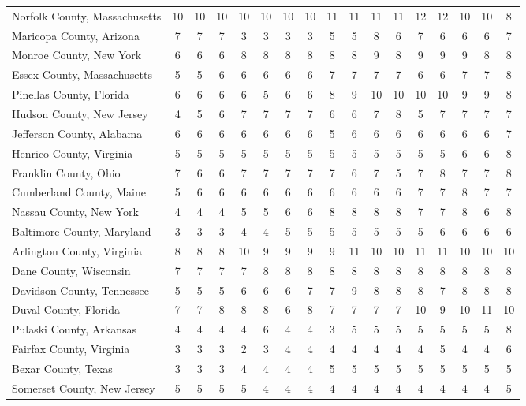 \begin{landscape}
\begin{longtable}{lcccccccccccccccc}
		Norfolk County, Massachusetts & 10 & 10 & 10 & 10 & 10 & 10 & 10 & 11 & 11 & 11 & 11 & 12 & 12 & 10 & 10 & 8 \\
		Maricopa County, Arizona & 7 & 7 & 7 & 3 & 3 & 3 & 3 & 5 & 5 & 8 & 6 & 7 & 6 & 6 & 6 & 7 \\
		Monroe County, New York & 6 & 6 & 6 & 8 & 8 & 8 & 8 & 8 & 8 & 9 & 8 & 9 & 9 & 9 & 8 & 8 \\
		Essex County, Massachusetts & 5 & 5 & 6 & 6 & 6 & 6 & 6 & 7 & 7 & 7 & 7 & 6 & 6 & 7 & 7 & 8 \\
		Pinellas County, Florida & 6 & 6 & 6 & 6 & 5 & 6 & 6 & 8 & 9 & 10 & 10 & 10 & 10 & 9 & 9 & 8 \\
		Hudson County, New Jersey & 4 & 5 & 6 & 7 & 7 & 7 & 7 & 6 & 6 & 7 & 8 & 5 & 7 & 7 & 7 & 7 \\
		Jefferson County, Alabama & 6 & 6 & 6 & 6 & 6 & 6 & 6 & 5 & 6 & 6 & 6 & 6 & 6 & 6 & 6 & 7 \\
		Henrico County, Virginia & 5 & 5 & 5 & 5 & 5 & 5 & 5 & 5 & 5 & 5 & 5 & 5 & 5 & 6 & 6 & 8 \\
		Franklin County, Ohio & 7 & 6 & 6 & 7 & 7 & 7 & 7 & 7 & 6 & 7 & 5 & 7 & 8 & 7 & 7 & 8 \\
		Cumberland County, Maine & 5 & 6 & 6 & 6 & 6 & 6 & 6 & 6 & 6 & 6 & 6 & 7 & 7 & 8 & 7 & 7 \\
		Nassau County, New York & 4 & 4 & 4 & 5 & 5 & 6 & 6 & 8 & 8 & 8 & 8 & 7 & 7 & 8 & 6 & 8 \\
		Baltimore County, Maryland & 3 & 3 & 3 & 4 & 4 & 5 & 5 & 5 & 5 & 5 & 5 & 5 & 6 & 6 & 6 & 6 \\
		Arlington County, Virginia & 8 & 8 & 8 & 10 & 9 & 9 & 9 & 9 & 11 & 10 & 10 & 11 & 11 & 10 & 10 & 10 \\
		Dane County, Wisconsin & 7 & 7 & 7 & 7 & 8 & 8 & 8 & 8 & 8 & 8 & 8 & 8 & 8 & 8 & 8 & 8 \\
		Davidson County, Tennessee & 5 & 5 & 5 & 6 & 6 & 6 & 7 & 7 & 9 & 8 & 8 & 8 & 7 & 8 & 8 & 8 \\
		Duval County, Florida & 7 & 7 & 8 & 8 & 8 & 6 & 8 & 7 & 7 & 7 & 7 & 10 & 9 & 10 & 11 & 10 \\
		Pulaski County, Arkansas & 4 & 4 & 4 & 4 & 6 & 4 & 4 & 3 & 5 & 5 & 5 & 5 & 5 & 5 & 5 & 8 \\
		Fairfax County, Virginia & 3 & 3 & 3 & 2 & 3 & 4 & 4 & 4 & 4 & 4 & 4 & 4 & 5 & 4 & 4 & 6 \\
		Bexar County, Texas & 3 & 3 & 3 & 4 & 4 & 4 & 4 & 5 & 5 & 5 & 5 & 5 & 5 & 5 & 5 & 5 \\
		Somerset County, New Jersey & 5 & 5 & 5 & 5 & 4 & 4 & 4 & 4 & 4 & 4 & 4 & 4 & 4 & 4 & 4 & 5 \\

\end{longtable}
\end{landscape}
